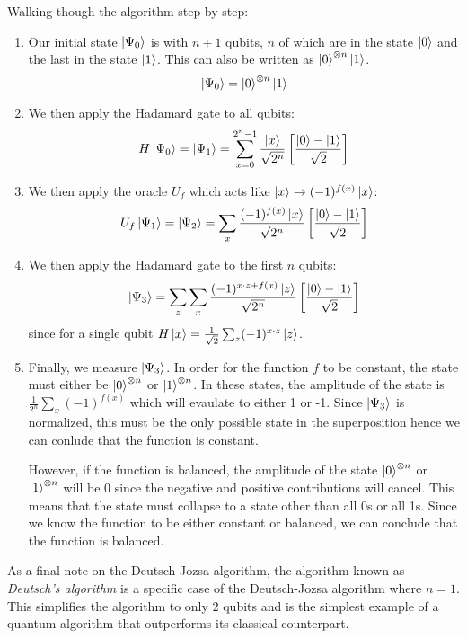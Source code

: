 \documentclass[reqno]{amsart}
\numberwithin{equation}{section}
\numberwithin{figure}{section}
\begin{document}
\begin{justify}
Walking though the algorithm step by step:
    \begin{enumerate}
        \item Our initial state $\ket{\Psi_{0}}$ is with $n+1$ qubits, $n$ of which are in the state $\ket{0}$ and the last in the state $\ket{1}$. This can also be written as $\ket{0}^{\otimes n}\ket{1}$.
            \begin{equation}
                \ket{\Psi_{0}} = \ket{0}^{\otimes n}\ket{1}
            \end{equation}
        \item We then apply the Hadamard gate to all qubits:
            \begin{equation}
                H\ket{\Psi_{0}} = \ket{\Psi_{1}} = \sum\limits_{x=0}^{2^{n}-1}\frac{\ket{x}}{\sqrt{2^{n}}}\left[\frac{\ket{0} - \ket{1}}{\sqrt{2}}\right]
            \end{equation}
        \item We then apply the oracle $U_{f}$ which acts like $\ket{x} \rightarrow (-1)^{f(x)}\ket{x}$:
            \begin{equation}
                U_{f}\ket{\Psi_{1}} = \ket{\Psi_{2}} = \sum\limits_{x}\frac{(-1)^{f(x)}\ket{x}}{\sqrt{2^{n}}}\left[\frac{\ket{0} - \ket{1}}{\sqrt{2}}\right]
            \end{equation}
        \item We then apply the Hadamard gate to the first $n$ qubits:
            \begin{equation}
                \ket{\Psi_{3}} = \sum\limits_{z}\sum\limits_{x}\frac{(-1)^{x \cdot z + f(x)}\ket{z}}{\sqrt{2^{n}}}\left[\frac{\ket{0} - \ket{1}}{\sqrt{2}}\right] \label{eq:finalstate}
            \end{equation}
            since for a single qubit $H\ket{x} = \frac{1}{\sqrt{2}}\sum_{z}(-1)^{x \cdot z}\ket{z}$.
        \item Finally, we measure $\ket{\Psi_{3}}$. In order for the function $f$ to be constant, the state must either be $\ket{0}^{\otimes n}$ or $\ket{1}^{\otimes n}$. In these states, the amplitude of the state is $\frac{1}{2^{n}}\sum_{x}(-1)^{f(x)}$ which will evaulate to either 1 or -1. Since $\ket{\Psi_{3}}$ is normalized, this must be the only possible state in the superposition hence we can conlude that the function is constant.

            However, if the function is balanced, the amplitude of the state $\ket{0}^{\otimes n}$ or $\ket{1}^{\otimes n}$ will be 0 since the negative and positive contributions will cancel. This means that the state must collapse to a state other than all 0s or all 1s. Since we know the function to be either constant or balanced, we can conclude that the function is balanced.
    \end{enumerate}

As a final note on the Deutsch-Jozsa algorithm, the algorithm known as \textit{Deutsch's algorithm} is a specific case of the Deutsch-Jozsa algorithm where $n = 1$. This simplifies the algorithm to only 2 qubits and is the simplest example of a quantum algorithm that outperforms its classical counterpart.
\end{justify}
\end{document}
